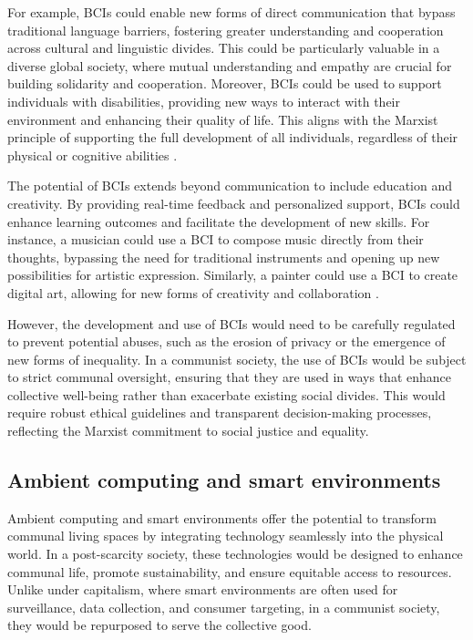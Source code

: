 For example, BCIs could enable new forms of direct communication that bypass traditional language barriers, fostering greater understanding and cooperation across cultural and linguistic divides. This could be particularly valuable in a diverse global society, where mutual understanding and empathy are crucial for building solidarity and cooperation. Moreover, BCIs could be used to support individuals with disabilities, providing new ways to interact with their environment and enhancing their quality of life. This aligns with the Marxist principle of supporting the full development of all individuals, regardless of their physical or cognitive abilities \cite[pp.~110-112]{haraway1991}.

The potential of BCIs extends beyond communication to include education and creativity. By providing real-time feedback and personalized support, BCIs could enhance learning outcomes and facilitate the development of new skills. For instance, a musician could use a BCI to compose music directly from their thoughts, bypassing the need for traditional instruments and opening up new possibilities for artistic expression. Similarly, a painter could use a BCI to create digital art, allowing for new forms of creativity and collaboration \cite[pp.~67-69]{debord1967}.

However, the development and use of BCIs would need to be carefully regulated to prevent potential abuses, such as the erosion of privacy or the emergence of new forms of inequality. In a communist society, the use of BCIs would be subject to strict communal oversight, ensuring that they are used in ways that enhance collective well-being rather than exacerbate existing social divides. This would require robust ethical guidelines and transparent decision-making processes, reflecting the Marxist commitment to social justice and equality.

\subsection{Ambient computing and smart environments}

Ambient computing and smart environments offer the potential to transform communal living spaces by integrating technology seamlessly into the physical world. In a post-scarcity society, these technologies would be designed to enhance communal life, promote sustainability, and ensure equitable access to resources. Unlike under capitalism, where smart environments are often used for surveillance, data collection, and consumer targeting, in a communist society, they would be repurposed to serve the collective good.

